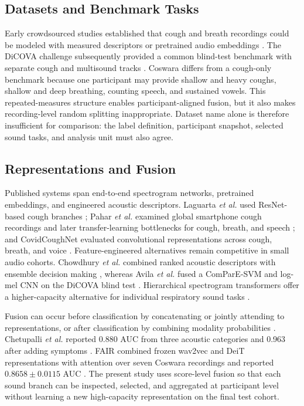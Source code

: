 \documentclass[conference]{IEEEtran}
\begin{document}
\subsection{Datasets and Benchmark Tasks}

Early crowdsourced studies established that cough and breath recordings could
be modeled with measured descriptors or pretrained audio embeddings
\cite{brown2020exploring}. The DiCOVA challenge subsequently provided a common
blind-test benchmark with separate cough and multisound tracks
\cite{muguli2021dicova}. Coswara differs from a cough-only benchmark because one
participant may provide shallow and heavy coughs, shallow and deep breathing,
counting speech, and sustained vowels. This repeated-measures structure enables
participant-aligned fusion, but it also makes recording-level random splitting
inappropriate. Dataset name alone is therefore insufficient for comparison:
the label definition, participant snapshot, selected sound tasks, and analysis
unit must also agree.

\subsection{Representations and Fusion}

Published systems span end-to-end spectrogram networks, pretrained embeddings,
and engineered acoustic descriptors. Laguarta \emph{et al.} used ResNet-based
cough branches \cite{laguarta2020cough}; Pahar \emph{et al.} examined global
smartphone cough recordings and later transfer-learning bottlenecks for cough,
breath, and speech \cite{pahar2021smartphone,pahar2022transfer}; and
CovidCoughNet evaluated convolutional representations across cough, breath, and
voice \cite{celik2023covidcoughnet}. Feature-engineered alternatives remain
competitive in small audio cohorts. Chowdhury \emph{et al.} combined ranked
acoustic descriptors with ensemble decision making \cite{chowdhury2022mcdm},
whereas Avila \emph{et al.} fused a ComParE-SVM and log-mel CNN on the DiCOVA
blind test \cite{avila2021feature}. Hierarchical spectrogram transformers offer
a higher-capacity alternative for individual respiratory sound tasks
\cite{aytekin2024hst}.

Fusion can occur before classification by concatenating or jointly attending to
representations, or after classification by combining modality probabilities
\cite{baltrusaitis2019survey}. Chetupalli \emph{et al.} reported 0.880 AUC from
three acoustic categories and 0.963 after adding symptoms
\cite{chetupalli2023multimodal}. FAIR combined frozen wav2vec and DeiT
representations with attention over seven Coswara recordings and reported
$0.8658\pm0.0115$ AUC \cite{truong2024fair}. The present study uses score-level
fusion so that each sound branch can be inspected, selected, and aggregated at
participant level without learning a new high-capacity representation on the
final test cohort.
\end{document}
